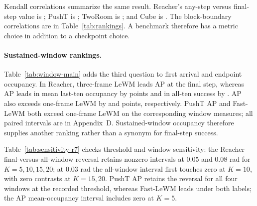 \documentclass[manuscript,screen,review]{jair}
\begin{document}
Kendall correlations summarize the same result. Reacher's any-step versus final-step value is \TauReacherAnyFinal; PushT is \TauPushtAnyFinal; TwoRoom is \TauTworoomAnyFinal; and Cube is \TauCubeAnyFinal. The block-boundary correlations are in Table~\ref{tab:rankings}. A benchmark therefore has a metric choice in addition to a checkpoint choice.

\paragraph{Sustained-window rankings.}
Table~\ref{tab:window-main} adds the third question to first arrival and endpoint occupancy. In Reacher, three-frame LeWM leads AP at the final step, whereas AP leads in mean last-ten occupancy by \RfourWindowOne{} points and in all-ten success by \RfourWindowTwo{}. AP also exceeds one-frame LeWM by \RfourWindowThree{} and \RfourWindowFour{} points, respectively. PushT AP and Fast-LeWM both exceed one-frame LeWM on the corresponding window measures; all paired intervals are in Appendix~D. Sustained-window occupancy therefore supplies another ranking rather than a synonym for final-step success.


Table~\ref{tab:sensitivity-r7} checks threshold and window sensitivity: the Reacher final-versus-all-window reversal retains nonzero intervals at 0.05 and 0.08 rad for $K=5,10,15,20$; at 0.03 rad the all-window interval first touches zero at $K=10$, with zero contrasts at $K=15,20$. PushT AP retains the reversal for all four windows at the recorded threshold, whereas Fast-LeWM leads under both labels; the AP mean-occupancy interval includes zero at $K=5$.
\end{document}
